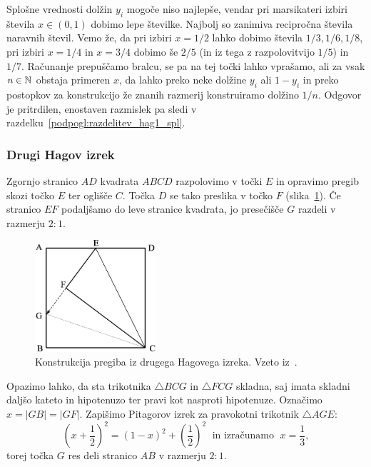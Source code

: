Splošne vrednosti dolžin $y_i$ mogoče niso najlepše, vendar pri marsikateri izbiri števila $x \in (0,1)$ dobimo lepe številke. Najbolj so zanimiva recipročna števila naravnih števil. Vemo že, da pri izbiri $x = 1/2$ lahko dobimo števila $1/3, 1/6, 1/8$, pri izbiri $x = 1/4$ in $x = 3/4$ dobimo še $2/5$ (in iz tega z razpolovitvijo $1/5$) in $1/7$. Računanje prepuščamo bralcu, se pa na tej točki lahko vprašamo, ali za vsak $n \in \mathbb N$ obstaja primeren $x$, da lahko preko neke dolžine $y_i$ ali $1-y_i$ in preko postopkov za konstrukcijo že znanih razmerij konstruiramo dolžino $1/n$. Odgovor je pritrdilen, enostaven razmislek pa sledi v razdelku~\ref{podpogl:razdelitev_hag1_spl}.

\subsubsection{Drugi Hagov izrek}

\begin{izrek}
    Zgornjo stranico $AD$ kvadrata $ABCD$ razpolovimo v točki $E$ in opravimo pregib skozi točko $E$ ter oglišče $C$. Točka $D$ se tako preslika v točko $F$ (slika~\ref{fig:hagov_izrek2}). Če stranico $EF$ podaljšamo do leve stranice kvadrata, jo presečišče $G$ razdeli v razmerju $2:1$.
\end{izrek}

\begin{figure}[h]
    \centering
    \includegraphics[width=0.4\textwidth]{images/hagovi_izreki/hagov_izrek2.png}
    \caption[Pregib iz drugega Hagovega izreka]{Konstrukcija pregiba iz drugega Hagovega izreka. Vzeto iz~\cite[str. 12]{haga2008}.}
    \label{fig:hagov_izrek2}
\end{figure}

\begin{dokaz}
    Opazimo lahko, da sta trikotnika $\triangle BCG$ in $\triangle FCG$ skladna, saj imata skladni daljšo kateto in hipotenuzo ter pravi kot nasproti hipotenuze. Označimo $x = |GB| = |GF|$. Zapišimo Pitagorov izrek za pravokotni trikotnik $\triangle AGE$:
    $$ \left(x + \frac{1}{2}\right)^2 = (1-x)^2 + \left(\frac{1}{2}\right)^2 \; \text{ in izračunamo } \; x = \frac{1}{3},$$
    torej točka $G$ res deli stranico $AB$ v razmerju $2:1$.
\end{dokaz}

